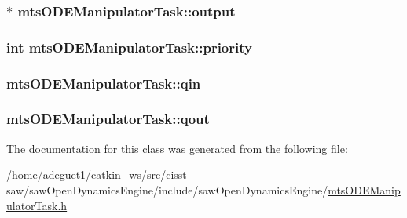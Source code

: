 \hypertarget{classmts_o_d_e_manipulator_task_a73b391727790f249e975cb84a385f753}{
\subsubsection[{output}]{$\ast$ mts\-O\-D\-E\-Manipulator\-Task\-::output}}\label{classmts_o_d_e_manipulator_task_a73b391727790f249e975cb84a385f753}
\hypertarget{classmts_o_d_e_manipulator_task_ae2b16e466e4d216b2cf13ae89414696a}{
\subsubsection[{priority}]{\setlength{\rightskip}{0pt plus 5cm}int mts\-O\-D\-E\-Manipulator\-Task\-::priority}}\label{classmts_o_d_e_manipulator_task_ae2b16e466e4d216b2cf13ae89414696a}
\hypertarget{classmts_o_d_e_manipulator_task_a07c031b24bcc9abafd6b00f1f8353a39}{
\subsubsection[{qin}]{ mts\-O\-D\-E\-Manipulator\-Task\-::qin}}\label{classmts_o_d_e_manipulator_task_a07c031b24bcc9abafd6b00f1f8353a39}
\hypertarget{classmts_o_d_e_manipulator_task_a162ca16e37ce8838ff2214b8b33f4b84}{
\subsubsection[{qout}]{ mts\-O\-D\-E\-Manipulator\-Task\-::qout}}\label{classmts_o_d_e_manipulator_task_a162ca16e37ce8838ff2214b8b33f4b84}


The documentation for this class was generated from the following file\-:\begin{DoxyCompactItemize}
\item 
/home/adeguet1/catkin\-\_\-ws/src/cisst-\/saw/saw\-Open\-Dynamics\-Engine/include/saw\-Open\-Dynamics\-Engine/\hyperlink{mts_o_d_e_manipulator_task_8h}{mts\-O\-D\-E\-Manipulator\-Task.\-h}\end{DoxyCompactItemize}
